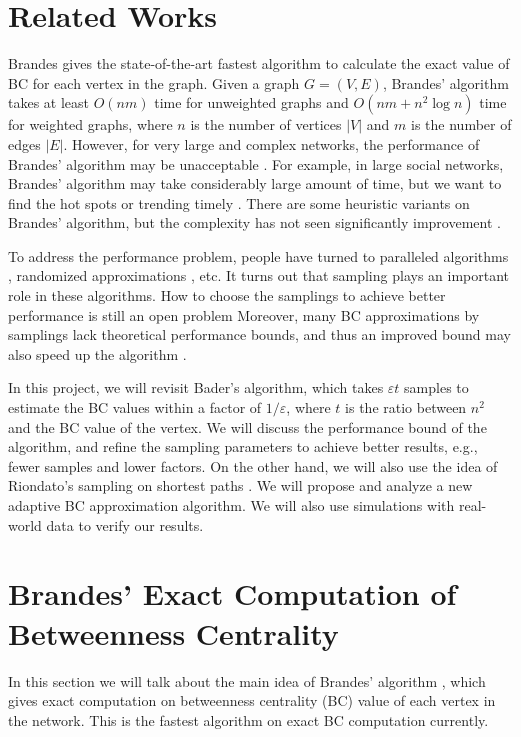 \documentclass[10pt]{article}
\begin{document}
\section{Related Works}
Brandes \cite{brandes2001faster, brandes2008variants} gives the state-of-the-art fastest algorithm to calculate the exact value of BC for each vertex in the graph. Given a graph $G=(V, E)$, Brandes' algorithm takes at least $O(nm)$ time for unweighted graphs and $O(nm + n^2 \log n)$ time for weighted graphs, where $n$ is the number of vertices $|V|$ and $m$ is the number of edges $|E|$. However, for very large and complex networks, the performance of Brandes' algorithm may be unacceptable \cite{bader2007approximating}. For example, in large social networks, Brandes' algorithm may take considerably large amount of time, but we want to find the hot spots or trending timely \cite{kourtellis2013identifying}. There are some heuristic variants on Brandes' algorithm, but the complexity has not seen significantly improvement \cite{puzis2012heuristics}. 

To address the performance problem, people have turned to paralleled algorithms \cite{madduri2009faster, bader2008graph, riondato2014fast}, randomized approximations \cite{bader2007approximating, geisberger2008better, riondato2014fast}, etc. It turns out that sampling plays an important role in these algorithms. How to choose the samplings to achieve better performance is still an open problem \cite{bader2007approximating} Moreover, many BC approximations by samplings lack theoretical performance bounds, and thus an improved bound may also speed up the algorithm \cite{geisberger2008better}. 

In this project, we will revisit Bader's algorithm, which takes $\varepsilon t$ samples to estimate the BC values within a factor of $1/\varepsilon$, where $t$ is the ratio between $n^2$ and the BC value of the vertex. We will discuss the performance bound of the algorithm, and refine the sampling parameters to achieve better results, e.g., fewer samples and lower factors. On the other hand, we will also use the idea of Riondato's sampling on shortest paths \cite{riondato2014fast}. We will propose and analyze a new adaptive BC approximation algorithm. We will also use simulations with real-world data to verify our results.

\section{Brandes' Exact Computation of Betweenness Centrality}
In this section we will talk about the main idea of Brandes' algorithm \cite{brandes2001faster}, which gives exact computation on betweenness centrality (BC) value of each vertex in the network. This is the fastest algorithm on exact BC computation currently.
\end{document}
